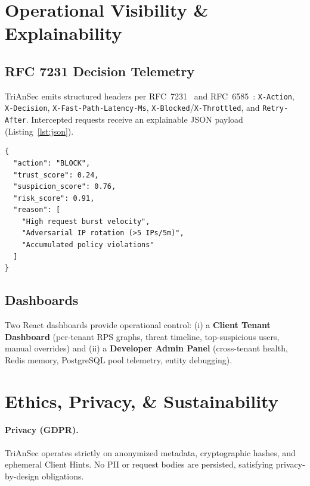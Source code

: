 \documentclass[journal,10pt]{IEEEtran}
\begin{document}
\begin{table}[!t]
\section{Operational Visibility \& Explainability}
\label{sec:explain}

\subsection{RFC 7231 Decision Telemetry}
TriAnSec emits structured headers per RFC~7231~\cite{rfc7231} and RFC~6585~\cite{rfc6585}: \texttt{X-Action}, \texttt{X-Decision}, \texttt{X-Fast-Path-Latency-Ms}, \texttt{X-Blocked}/\texttt{X-Throttled}, and \texttt{Retry-After}. Intercepted requests receive an explainable JSON payload (Listing~\ref{lst:json}).

\begin{lstlisting}[caption={Structured explainability payload.}, label={lst:json}, numbers=none, basicstyle=\ttfamily\scriptsize, breaklines=true, columns=fullflexible]
{
  "action": "BLOCK",
  "trust_score": 0.24,
  "suspicion_score": 0.76,
  "risk_score": 0.91,
  "reason": [
    "High request burst velocity",
    "Adversarial IP rotation (>5 IPs/5m)",
    "Accumulated policy violations"
  ]
}
\end{lstlisting}

\subsection{Dashboards}
Two React dashboards provide operational control: (i) a \textbf{Client Tenant Dashboard} (per-tenant RPS graphs, threat timeline, top-suspicious users, manual overrides) and (ii) a \textbf{Developer Admin Panel} (cross-tenant health, Redis memory, PostgreSQL pool telemetry, entity debugging).

\section{Ethics, Privacy, \& Sustainability}
\label{sec:ethics}

\paragraph{Privacy (GDPR).} TriAnSec operates strictly on anonymized metadata, cryptographic hashes, and ephemeral Client Hints. No PII or request bodies are persisted, satisfying privacy-by-design obligations.


\end{table}
\end{document}
